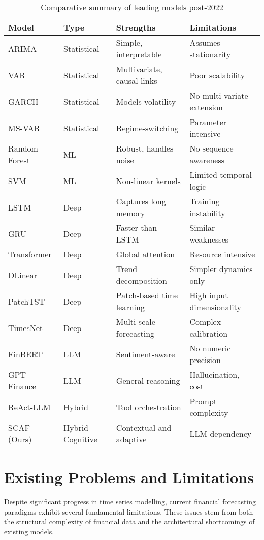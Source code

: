 \documentclass[conference]{IEEEtran}
\begin{document}
\begin{table}[h]
\centering
\begin{tabular}{|l|l|l|l|}
\hline
\textbf{Model} & \textbf{Type} & \textbf{Strengths} & \textbf{Limitations} \\
\hline
ARIMA & Statistical & Simple, interpretable & Assumes stationarity \\
VAR & Statistical & Multivariate, causal links & Poor scalability \\
GARCH & Statistical & Models volatility & No multi-variate extension \\
MS-VAR & Statistical & Regime-switching & Parameter intensive \\
Random Forest & ML & Robust, handles noise & No sequence awareness \\
SVM & ML & Non-linear kernels & Limited temporal logic \\
LSTM & Deep & Captures long memory & Training instability \\
GRU & Deep & Faster than LSTM & Similar weaknesses \\
Transformer & Deep & Global attention & Resource intensive \\
DLinear & Deep & Trend decomposition & Simpler dynamics only \\
PatchTST & Deep & Patch-based time learning & High input dimensionality \\
TimesNet & Deep & Multi-scale forecasting & Complex calibration \\
FinBERT & LLM & Sentiment-aware & No numeric precision \\
GPT-Finance & LLM & General reasoning & Hallucination, cost \\
ReAct-LLM & Hybrid & Tool orchestration & Prompt complexity \\
SCAF (Ours) & Hybrid Cognitive & Contextual and adaptive & LLM dependency \\
\hline
\end{tabular}
\caption{Comparative summary of leading models post-2022}
\end{table}




\section{Existing Problems and Limitations}

Despite significant progress in time series modelling, current financial forecasting paradigms exhibit several fundamental limitations. These issues stem from both the structural complexity of financial data and the architectural shortcomings of existing models.
\end{document}
